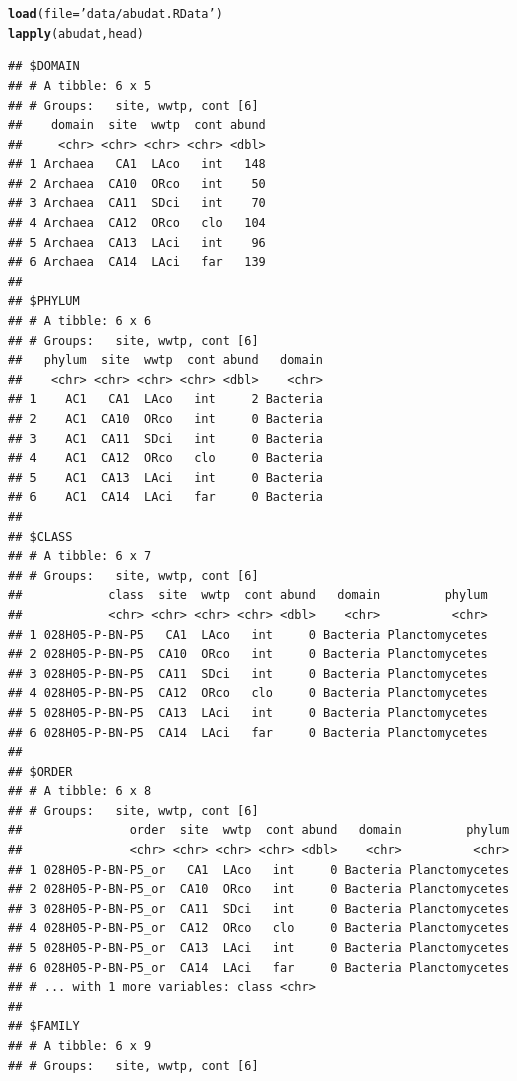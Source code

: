 \documentclass[letterpaper,12pt]{article}\usepackage[]{graphicx}\usepackage[]{color}
\makeatletter
\newcommand{\hlstr}[1]{\textcolor[rgb]{0.192,0.494,0.8}{#1}}%
\newcommand{\hlstd}[1]{\textcolor[rgb]{0.345,0.345,0.345}{#1}}%
\newcommand{\hlkwc}[1]{\textcolor[rgb]{0.333,0.667,0.333}{#1}}%
\newcommand{\hlkwd}[1]{\textcolor[rgb]{0.737,0.353,0.396}{\textbf{#1}}}%
\newenvironment{kframe}{%
 \def\at@end@of@kframe{}%
 \ifinner\ifhmode%
  \def\at@end@of@kframe{\end{minipage}}%
  \begin{minipage}{\columnwidth}%
 \fi\fi%
 \def\FrameCommand##1{\hskip\@totalleftmargin \hskip-\fboxsep
 \colorbox{shadecolor}{##1}\hskip-\fboxsep
     \hskip-\linewidth \hskip-\@totalleftmargin \hskip\columnwidth}%
 \MakeFramed {\advance\hsize-\width
   \@totalleftmargin\z@ \linewidth\hsize
   \@setminipage}}%
 {\par\unskip\endMakeFramed%
 \at@end@of@kframe}
\newenvironment{knitrout}{}{} %
\makeatother
\begin{document}
\begin{knitrout}
\color{fgcolor}\begin{kframe}
\begin{alltt}
\hlkwd{load}\hlstd{(}\hlkwc{file} \hlstd{=} \hlstr{'data/abudat.RData'}\hlstd{)}
\hlkwd{lapply}\hlstd{(abudat, head)}
\end{alltt}
\begin{verbatim}
## $DOMAIN
## # A tibble: 6 x 5
## # Groups:   site, wwtp, cont [6]
##    domain  site  wwtp  cont abund
##     <chr> <chr> <chr> <chr> <dbl>
## 1 Archaea   CA1  LAco   int   148
## 2 Archaea  CA10  ORco   int    50
## 3 Archaea  CA11  SDci   int    70
## 4 Archaea  CA12  ORco   clo   104
## 5 Archaea  CA13  LAci   int    96
## 6 Archaea  CA14  LAci   far   139
## 
## $PHYLUM
## # A tibble: 6 x 6
## # Groups:   site, wwtp, cont [6]
##   phylum  site  wwtp  cont abund   domain
##    <chr> <chr> <chr> <chr> <dbl>    <chr>
## 1    AC1   CA1  LAco   int     2 Bacteria
## 2    AC1  CA10  ORco   int     0 Bacteria
## 3    AC1  CA11  SDci   int     0 Bacteria
## 4    AC1  CA12  ORco   clo     0 Bacteria
## 5    AC1  CA13  LAci   int     0 Bacteria
## 6    AC1  CA14  LAci   far     0 Bacteria
## 
## $CLASS
## # A tibble: 6 x 7
## # Groups:   site, wwtp, cont [6]
##            class  site  wwtp  cont abund   domain         phylum
##            <chr> <chr> <chr> <chr> <dbl>    <chr>          <chr>
## 1 028H05-P-BN-P5   CA1  LAco   int     0 Bacteria Planctomycetes
## 2 028H05-P-BN-P5  CA10  ORco   int     0 Bacteria Planctomycetes
## 3 028H05-P-BN-P5  CA11  SDci   int     0 Bacteria Planctomycetes
## 4 028H05-P-BN-P5  CA12  ORco   clo     0 Bacteria Planctomycetes
## 5 028H05-P-BN-P5  CA13  LAci   int     0 Bacteria Planctomycetes
## 6 028H05-P-BN-P5  CA14  LAci   far     0 Bacteria Planctomycetes
## 
## $ORDER
## # A tibble: 6 x 8
## # Groups:   site, wwtp, cont [6]
##               order  site  wwtp  cont abund   domain         phylum
##               <chr> <chr> <chr> <chr> <dbl>    <chr>          <chr>
## 1 028H05-P-BN-P5_or   CA1  LAco   int     0 Bacteria Planctomycetes
## 2 028H05-P-BN-P5_or  CA10  ORco   int     0 Bacteria Planctomycetes
## 3 028H05-P-BN-P5_or  CA11  SDci   int     0 Bacteria Planctomycetes
## 4 028H05-P-BN-P5_or  CA12  ORco   clo     0 Bacteria Planctomycetes
## 5 028H05-P-BN-P5_or  CA13  LAci   int     0 Bacteria Planctomycetes
## 6 028H05-P-BN-P5_or  CA14  LAci   far     0 Bacteria Planctomycetes
## # ... with 1 more variables: class <chr>
## 
## $FAMILY
## # A tibble: 6 x 9
## # Groups:   site, wwtp, cont [6]

\end{verbatim}
\end{kframe}
\end{knitrout}
\end{document}
